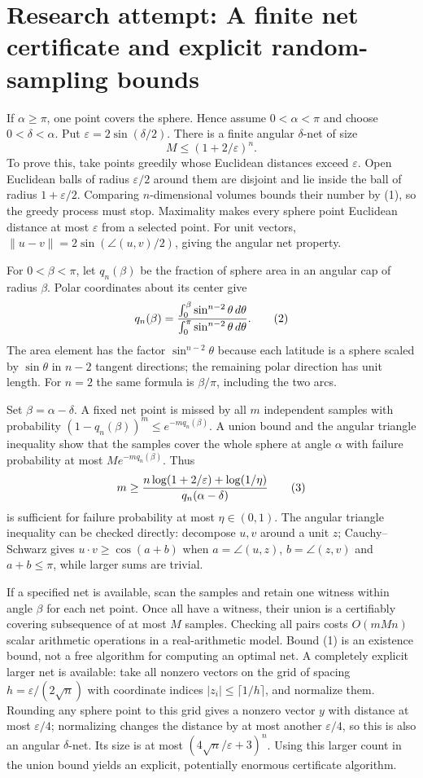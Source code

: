 \documentclass[11pt]{article}
\begin{document}
\section{Research attempt: A finite net certificate and explicit random-sampling bounds}
If $\alpha\geq\pi$, one point covers the sphere. Hence assume $0<\alpha<\pi$ and choose $0<\delta<\alpha$. Put $\varepsilon=2\sin(\delta/2)$. There is a finite angular $\delta$-net of size
\[
 M\leq(1+2/\varepsilon)^n.                          \tag{1}
\]
To prove this, take points greedily whose Euclidean distances exceed $\varepsilon$. Open Euclidean balls of radius $\varepsilon/2$ around them are disjoint and lie inside the ball of radius $1+\varepsilon/2$. Comparing $n$-dimensional volumes bounds their number by (1), so the greedy process must stop. Maximality makes every sphere point Euclidean distance at most $\varepsilon$ from a selected point. For unit vectors, $\|u-v\|=2\sin(\angle(u,v)/2)$, giving the angular net property.

For $0<\beta<\pi$, let $q_n(\beta)$ be the fraction of sphere area in an angular cap of radius $\beta$. Polar coordinates about its center give
\[
 q_n(\beta)={\int_0^\beta\sin^{n-2}\theta\,d\theta
                    \over\int_0^\pi\sin^{n-2}\theta\,d\theta}.       \tag{2}
\]
The area element has the factor $\sin^{n-2}\theta$ because each latitude is a sphere scaled by $\sin\theta$ in $n-2$ tangent directions; the remaining polar direction has unit length. For $n=2$ the same formula is $\beta/\pi$, including the two arcs.

Set $\beta=\alpha-\delta$. A fixed net point is missed by all $m$ independent samples with probability $(1-q_n(\beta))^m\leq e^{-m q_n(\beta)}$. A union bound and the angular triangle inequality show that the samples cover the whole sphere at angle $\alpha$ with failure probability at most $M e^{-m q_n(\beta)}$. Thus
\[
 m\geq{n\log(1+2/\varepsilon)+\log(1/\eta)\over q_n(\alpha-\delta)}  \tag{3}
\]
is sufficient for failure probability at most $\eta\in(0,1)$. The angular triangle inequality can be checked directly: decompose $u,v$ around a unit $z$; Cauchy--Schwarz gives $u\cdot v\geq\cos(a+b)$ when $a=\angle(u,z)$, $b=\angle(z,v)$ and $a+b\leq\pi$, while larger sums are trivial.

If a specified net is available, scan the samples and retain one witness within angle $\beta$ for each net point. Once all have a witness, their union is a certifiably covering subsequence of at most $M$ samples. Checking all pairs costs $O(mMn)$ scalar arithmetic operations in a real-arithmetic model. Bound (1) is an existence bound, not a free algorithm for computing an optimal net. A completely explicit larger net is available: take all nonzero vectors on the grid of spacing $h=\varepsilon/(2\sqrt n)$ with coordinate indices $|z_i|\leq\lceil1/h\rceil$, and normalize them. Rounding any sphere point to this grid gives a nonzero vector $y$ with distance at most $\varepsilon/4$; normalizing changes the distance by at most another $\varepsilon/4$, so this is also an angular $\delta$-net. Its size is at most $(4\sqrt n/\varepsilon+3)^n$. Using this larger count in the union bound yields an explicit, potentially enormous certificate algorithm.
\end{document}
